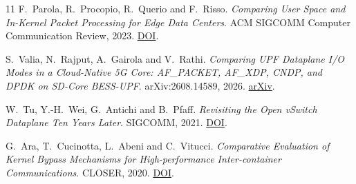 \documentclass[11pt,a4paper]{article}
\begin{document}
\begin{thebibliography}{11}
F.~Parola, R.~Procopio, R.~Querio and F.~Risso.
\emph{Comparing User Space and In-Kernel Packet Processing for Edge Data Centers}.
ACM SIGCOMM Computer Communication Review, 2023.
\href{https://doi.org/10.1145/3594255.3594257}{DOI}.

S.~Valia, N.~Rajput, A.~Gairola and V.~Rathi.
\emph{Comparing UPF Dataplane I/O Modes in a Cloud-Native 5G Core: AF\_PACKET, AF\_XDP, CNDP, and DPDK on SD-Core BESS-UPF}.
arXiv:2608.14589, 2026.
\href{https://arxiv.org/abs/2608.14589}{arXiv}.

W.~Tu, Y.-H.~Wei, G.~Antichi and B.~Pfaff.
\emph{Revisiting the Open vSwitch Dataplane Ten Years Later}.
SIGCOMM, 2021.
\href{https://doi.org/10.1145/3452296.3472914}{DOI}.

G.~Ara, T.~Cucinotta, L.~Abeni and C.~Vitucci.
\emph{Comparative Evaluation of Kernel Bypass Mechanisms for High-performance Inter-container Communications}.
CLOSER, 2020.
\href{https://doi.org/10.5220/0009321200440055}{DOI}.

\end{thebibliography}
\end{document}
